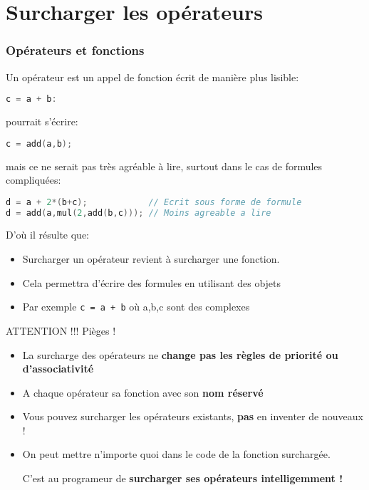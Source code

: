 \documentclass{beamer}
\begin{document}
\section{Surcharger les opérateurs}
\begin{frame}[fragile=singleslide,shrink=20]
\frametitle {Opérateurs et fonctions}
Un opérateur est un appel de fonction écrit de manière plus lisible:

\begin{lstlisting}[language=c++]
c = a + b:
\end{lstlisting}

pourrait s'écrire:

\begin{lstlisting}[language=c++]
c = add(a,b);
\end{lstlisting}
 mais ce ne serait pas très agréable à lire, surtout dans le cas de formules compliquées:
\begin{lstlisting}[language=c++]
d = a + 2*(b+c);            // Ecrit sous forme de formule
d = add(a,mul(2,add(b,c))); // Moins agreable a lire
\end{lstlisting}

D'où il résulte que:
\begin{itemize}
\item{Surcharger un opérateur revient à surcharger une fonction.}
\item{Cela permettra d'écrire des formules en utilisant des objets}
\item{Par exemple \texttt{c = a + b} où a,b,c sont des complexes}
\end{itemize}

\begin{block}{ATTENTION !!! Pièges !}
\begin{itemize}
\item{La surcharge des opérateurs ne \textbf{change pas les règles de priorité ou d'associativité}}
\item{A chaque opérateur sa fonction avec son \textbf{nom réservé}}
\item{Vous pouvez surcharger les opérateurs existants, \textbf{pas} en inventer de nouveaux !}
\item{On peut mettre n'importe quoi dans le code de la fonction surchargée.

C'est au programeur de \textbf{surcharger ses opérateurs intelligemment !}}
\end{itemize}
\end{block}
\end{frame} 
\end{document}
